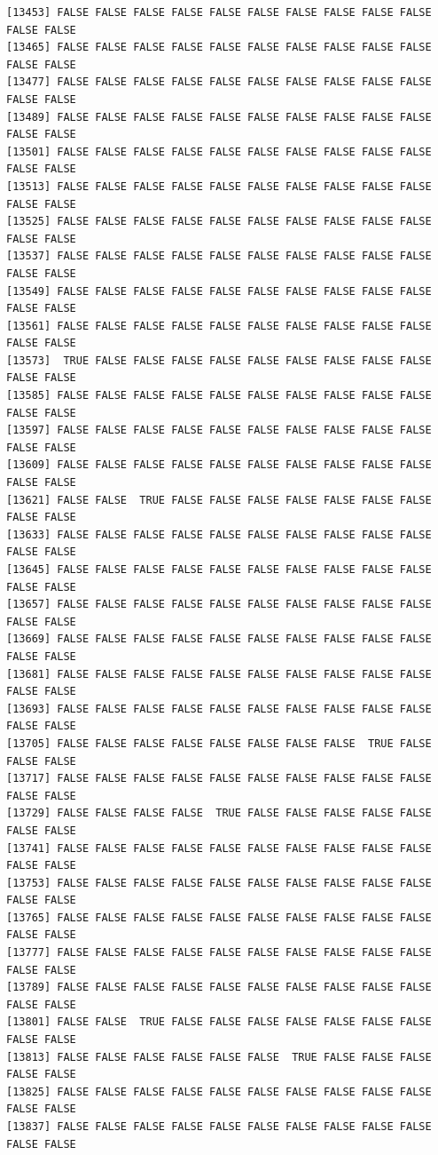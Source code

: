 \documentclass[
  a4paper,
  DIV=11,
  numbers=noendperiod]{scrartcl}
\begin{document}
\begin{verbatim}
[13453] FALSE FALSE FALSE FALSE FALSE FALSE FALSE FALSE FALSE FALSE FALSE FALSE
[13465] FALSE FALSE FALSE FALSE FALSE FALSE FALSE FALSE FALSE FALSE FALSE FALSE
[13477] FALSE FALSE FALSE FALSE FALSE FALSE FALSE FALSE FALSE FALSE FALSE FALSE
[13489] FALSE FALSE FALSE FALSE FALSE FALSE FALSE FALSE FALSE FALSE FALSE FALSE
[13501] FALSE FALSE FALSE FALSE FALSE FALSE FALSE FALSE FALSE FALSE FALSE FALSE
[13513] FALSE FALSE FALSE FALSE FALSE FALSE FALSE FALSE FALSE FALSE FALSE FALSE
[13525] FALSE FALSE FALSE FALSE FALSE FALSE FALSE FALSE FALSE FALSE FALSE FALSE
[13537] FALSE FALSE FALSE FALSE FALSE FALSE FALSE FALSE FALSE FALSE FALSE FALSE
[13549] FALSE FALSE FALSE FALSE FALSE FALSE FALSE FALSE FALSE FALSE FALSE FALSE
[13561] FALSE FALSE FALSE FALSE FALSE FALSE FALSE FALSE FALSE FALSE FALSE FALSE
[13573]  TRUE FALSE FALSE FALSE FALSE FALSE FALSE FALSE FALSE FALSE FALSE FALSE
[13585] FALSE FALSE FALSE FALSE FALSE FALSE FALSE FALSE FALSE FALSE FALSE FALSE
[13597] FALSE FALSE FALSE FALSE FALSE FALSE FALSE FALSE FALSE FALSE FALSE FALSE
[13609] FALSE FALSE FALSE FALSE FALSE FALSE FALSE FALSE FALSE FALSE FALSE FALSE
[13621] FALSE FALSE  TRUE FALSE FALSE FALSE FALSE FALSE FALSE FALSE FALSE FALSE
[13633] FALSE FALSE FALSE FALSE FALSE FALSE FALSE FALSE FALSE FALSE FALSE FALSE
[13645] FALSE FALSE FALSE FALSE FALSE FALSE FALSE FALSE FALSE FALSE FALSE FALSE
[13657] FALSE FALSE FALSE FALSE FALSE FALSE FALSE FALSE FALSE FALSE FALSE FALSE
[13669] FALSE FALSE FALSE FALSE FALSE FALSE FALSE FALSE FALSE FALSE FALSE FALSE
[13681] FALSE FALSE FALSE FALSE FALSE FALSE FALSE FALSE FALSE FALSE FALSE FALSE
[13693] FALSE FALSE FALSE FALSE FALSE FALSE FALSE FALSE FALSE FALSE FALSE FALSE
[13705] FALSE FALSE FALSE FALSE FALSE FALSE FALSE FALSE  TRUE FALSE FALSE FALSE
[13717] FALSE FALSE FALSE FALSE FALSE FALSE FALSE FALSE FALSE FALSE FALSE FALSE
[13729] FALSE FALSE FALSE FALSE  TRUE FALSE FALSE FALSE FALSE FALSE FALSE FALSE
[13741] FALSE FALSE FALSE FALSE FALSE FALSE FALSE FALSE FALSE FALSE FALSE FALSE
[13753] FALSE FALSE FALSE FALSE FALSE FALSE FALSE FALSE FALSE FALSE FALSE FALSE
[13765] FALSE FALSE FALSE FALSE FALSE FALSE FALSE FALSE FALSE FALSE FALSE FALSE
[13777] FALSE FALSE FALSE FALSE FALSE FALSE FALSE FALSE FALSE FALSE FALSE FALSE
[13789] FALSE FALSE FALSE FALSE FALSE FALSE FALSE FALSE FALSE FALSE FALSE FALSE
[13801] FALSE FALSE  TRUE FALSE FALSE FALSE FALSE FALSE FALSE FALSE FALSE FALSE
[13813] FALSE FALSE FALSE FALSE FALSE FALSE  TRUE FALSE FALSE FALSE FALSE FALSE
[13825] FALSE FALSE FALSE FALSE FALSE FALSE FALSE FALSE FALSE FALSE FALSE FALSE
[13837] FALSE FALSE FALSE FALSE FALSE FALSE FALSE FALSE FALSE FALSE FALSE FALSE

\end{verbatim}
\end{document}
